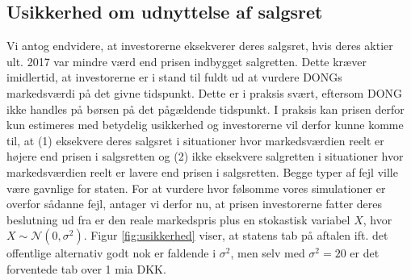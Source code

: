 \documentclass{article}
\begin{document}
%

\subsection{Usikkerhed om udnyttelse af salgsret}

 Vi antog endvidere, at investorerne eksekverer deres salgsret, hvis deres aktier ult. 2017 var mindre værd end prisen indbygget salgretten. Dette kræver imidlertid, at investorerne er i stand til fuldt ud at vurdere DONGs markedsværdi på det givne tidspunkt. Dette er i praksis svært, eftersom DONG ikke handles på børsen på det pågældende tidspunkt. I praksis kan prisen derfor kun estimeres med betydelig usikkerhed og  investorerne vil derfor kunne komme til, at (1) eksekvere deres salgsret i situationer hvor markedsværdien reelt er højere end prisen i salgsretten og (2) ikke eksekvere salgretten i situationer hvor markedsværdien reelt er lavere end prisen i salgsretten. Begge typer af fejl ville være gavnlige for staten. For at vurdere hvor følsomme vores simulationer er overfor sådanne fejl, antager vi derfor nu, at prisen investorerne fatter deres beslutning ud fra er den reale markedspris plus en stokastisk variabel $X$, hvor $X \sim \mathcal{N}(0, \sigma^2)$. Figur \ref{fig:usikkerhed} viser, at statens tab på aftalen ift. det offentlige alternativ godt nok er faldende i $\sigma^2$, men selv med $\sigma^2=20$ er det forventede tab over 1 mia DKK.%
 
\end{document}
